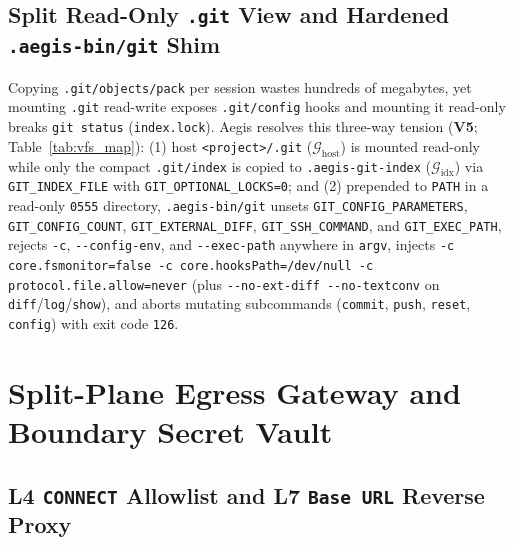 \documentclass[10pt,journal,compsoc]{IEEEtran}
\begin{document}
\subsection{Split Read-Only \texttt{.git} View and Hardened \texttt{.aegis-bin/git} Shim}

Copying \texttt{.git/objects/pack} per session wastes hundreds of megabytes, yet mounting \texttt{.git} read-write exposes \texttt{.git/config} hooks and mounting it read-only breaks \texttt{git status} (\texttt{index.lock}). Aegis resolves this three-way tension (\textbf{V5}; Table~\ref{tab:vfs_map}): (1) host \texttt{<project>/.git} ($\mathcal{G}_{\text{host}}$) is mounted read-only while only the compact \texttt{.git/index} is copied to \texttt{.aegis-git-index} ($\mathcal{G}_{\text{idx}}$) via \texttt{GIT\_INDEX\_FILE} with \texttt{GIT\_OPTIONAL\_LOCKS=0}; and (2) prepended to \texttt{PATH} in a read-only \texttt{0555} directory, \texttt{.aegis-bin/git} unsets \texttt{GIT\_\allowbreak CONFIG\_\allowbreak PARAMETERS}, \texttt{GIT\_\allowbreak CONFIG\_\allowbreak COUNT}, \texttt{GIT\_\allowbreak EXTERNAL\_\allowbreak DIFF}, \texttt{GIT\_\allowbreak SSH\_\allowbreak COMMAND}, and \texttt{GIT\_\allowbreak EXEC\_\allowbreak PATH}, rejects \texttt{-c}, \texttt{-\/-config-env}, and \texttt{-\/-exec-path} anywhere in \texttt{argv}, injects \texttt{-c core.fsmonitor=false -c core.hooksPath=/dev/null -c protocol.file.allow=never} (plus \texttt{-\/-no-ext-diff -\/-no-textconv} on \texttt{diff}/\texttt{log}/\texttt{show}), and aborts mutating subcommands (\texttt{commit}, \texttt{push}, \texttt{reset}, \texttt{config}) with exit code \texttt{126}.

\section{Split-Plane Egress Gateway and Boundary Secret Vault}
\label{sec:egress}

\subsection{L4 \texttt{CONNECT} Allowlist and L7 \texttt{Base URL} Reverse Proxy}
\end{document}
